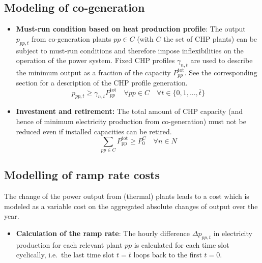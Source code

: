 \documentclass[]{article}
\begin{document}
\subsection{Modeling of co-generation}\label{modeling-of-co-generation}

\begin{itemize}
\itemsep1pt\parskip0pt
\item
  \textbf{Must-run condition based on heat production profile}: The
  output $p_{pp,t}$ from co-generation plants $pp\in C$ (with $C$ the
  set of CHP plants) can be subject to must-run conditions and therefore
  impose inflexibilities on the operation of the power system. Fixed CHP
  profiles $\gamma_{n,t}$ are used to describe the minimum output as a
  fraction of the capacity $P^\mathrm{tot}_{pp}$. See the corresponding
  section for a description of the CHP profile generation. \[
  p_{pp,t} \geqslant \gamma_{n,t} P^\mathrm{tot}_{pp}\quad\forall pp \in C\quad \forall t \in \{0, 1, ..., \bar t\}
  \]
\end{itemize}


\begin{itemize}
\itemsep1pt\parskip0pt
\item
  \textbf{Investment and retirement:} The total amount of CHP capacity
  (and hence of minimum electricity production from co-generation) must
  not be reduced even if installed capacities can be retired. \[
  \sum_{pp\in C} P^\mathrm{tot}_\mathrm{{pp}} \geqslant P^C_0\quad\forall n \in N
  \]
\end{itemize}

\subsection{Modelling of ramp rate
costs}\label{modelling-of-ramp-rate-costs}

The change of the power output from (thermal) plants leads to a cost
which is modeled as a variable cost on the aggregated absolute changes
of output over the year.

\begin{itemize}
\itemsep1pt\parskip0pt
\item
  \textbf{Calculation of the ramp rate}: The hourly difference
  $\Delta p_{pp,t}$ in electricity production for each relevant plant
  $pp$ is calculated for each time slot cyclically, i.e.~the last time
  slot $t=\bar t$ loops back to the first $t=0$.
\end{itemize}
\end{document}
